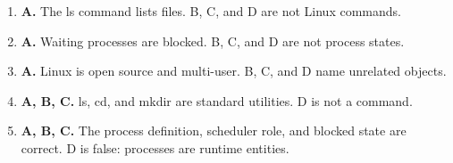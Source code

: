 \documentclass[11pt]{article}
\begin{document}
\begin{enumerate}[label=\textbf{Q\arabic*.}, leftmargin=*]
\item \textbf{A.} The ls command lists files. B, C, and D are not Linux commands.
\item \textbf{A.} Waiting processes are blocked. B, C, and D are not process states.
\item \textbf{A.} Linux is open source and multi-user. B, C, and D name unrelated objects.
\item \textbf{A, B, C.} ls, cd, and mkdir are standard utilities. D is not a command.
\item \textbf{A, B, C.} The process definition, scheduler role, and blocked state are correct. D is false: processes are runtime entities.
\end{enumerate}
\def\JKSSBLessonID{60}\def\JKSSBAnswers{1}
\end{document}
